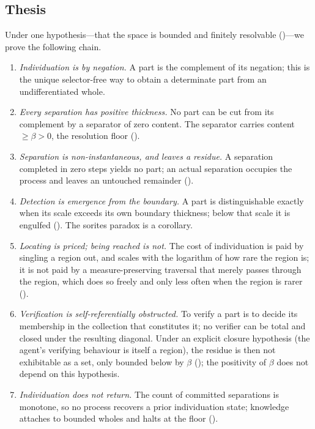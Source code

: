 \documentclass[11pt,twocolumn,a4paper]{article}
\theoremstyle{thmstyle}
\theoremstyle{definition}
\theoremstyle{remark}
\newcommand{\thick}{\beta}
\begin{document}
\subsection{Thesis}

Under one hypothesis---that the space is bounded and finitely resolvable
()---we prove the following chain.

\begin{enumerate}[label=(\roman*),leftmargin=2.2em]
\item \emph{Individuation is by negation.} A part is the complement of its
negation; this is the unique selector-free way to obtain a determinate part
from an undifferentiated whole.
\item \emph{Every separation has positive thickness.} No part can be cut from
its complement by a separator of zero content. The separator carries content
$\ge\thick>0$, the resolution floor ().
\item \emph{Separation is non-instantaneous, and leaves a residue.} A
separation completed in zero steps yields no part; an actual separation
occupies the process and leaves an untouched remainder
().
\item \emph{Detection is emergence from the boundary.} A part is
distinguishable exactly when its scale exceeds its own boundary thickness;
below that scale it is engulfed (). The sorites paradox is a
corollary.
\item \emph{Locating is priced; being reached is not.} The cost of
individuation is paid by singling a region out, and scales with the logarithm of
how rare the region is; it is not paid by a measure-preserving traversal that
merely passes through the region, which does so freely and only less often when
the region is rarer ().
\item \emph{Verification is self-referentially obstructed.} To verify a part
is to decide its membership in the collection that constitutes it; no verifier can
be total and closed under the resulting diagonal. Under an explicit closure
hypothesis (the agent's verifying behaviour is itself a region), the residue is
then not exhibitable as a set, only bounded below by $\thick$
(); the positivity of $\thick$ does not depend on this
hypothesis.
\item \emph{Individuation does not return.} The count of committed separations
is monotone, so no process recovers a prior individuation state; knowledge
attaches to bounded wholes and halts at the floor ().
\end{enumerate}
\end{document}
